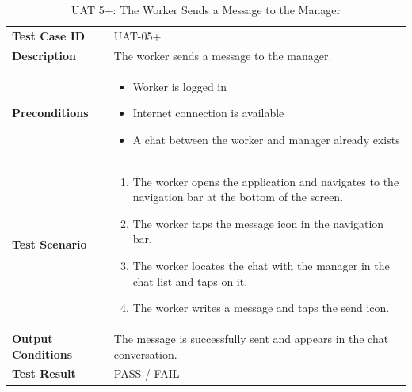 \documentclass[12pt,a4paper]{article}
\begin{document}
\begin{table}[h]
\centering
\caption{UAT 5+: The Worker Sends a Message to the Manager}
\begin{tabularx}{\textwidth}{>{\bfseries}l X}
\toprule
Test Case ID & UAT-05+ \\
Description & The worker sends a message to the manager. \\
Preconditions &
\begin{itemize}[noitemsep]
    \item Worker is logged in
    \item Internet connection is available
    \item A chat between the worker and manager already exists
\end{itemize} \\
Test Scenario &
\begin{enumerate}[noitemsep]
    \item The worker opens the application and navigates to the navigation bar at the bottom of the screen.
    \item The worker taps the message icon in the navigation bar.
    \item The worker locates the chat with the manager in the chat list and taps on it.
    \item The worker writes a message and taps the send icon.
\end{enumerate} \\
Output Conditions & The message is successfully sent and appears in the chat conversation. \\
Test Result & PASS / FAIL \\
\bottomrule
\end{tabularx}
\end{table}
\end{document}
